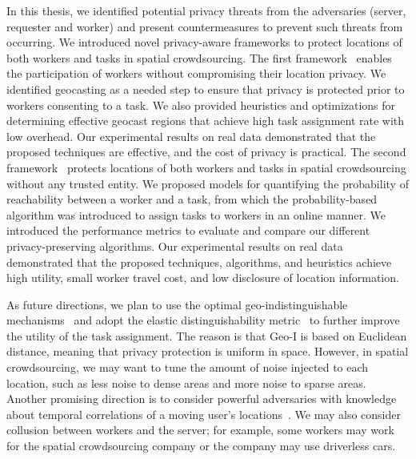 \documentclass{USC-Thesis}
\numberwithin{equation}{chapter}
\begin{document}
In this thesis, we identified potential privacy threats from the adversaries (server, requester and worker) and present countermeasures to prevent such threats from occurring. We introduced novel privacy-aware frameworks to protect locations of both workers and tasks in spatial crowdsourcing. 
The first framework~\cite{to2014framework} enables the participation of workers without compromising their location privacy.
We identified geocasting as a needed step to ensure that privacy is protected prior to workers consenting to a task. We also provided heuristics and optimizations for determining effective geocast regions that achieve high task assignment rate with low overhead. Our experimental results on real data demonstrated that the proposed techniques are effective, and the cost of privacy is practical.
The second framework~\cite{to2018privacy} protects locations of both workers and tasks in spatial crowdsourcing without any trusted entity. We proposed models for quantifying the probability of reachability between a worker and a task, from which the probability-based algorithm was introduced to assign tasks to workers in an online manner. We introduced the performance metrics to evaluate and compare our different privacy-preserving algorithms. Our experimental results on real data demonstrated that the proposed techniques, algorithms, and heuristics achieve high utility, small worker travel cost, and low disclosure of location information.

As future directions, we plan to use the optimal geo-indistinguishable mechanisms~\cite{bordenabe2014optimal} and adopt the elastic distinguishability metric~\cite{chatzikokolakis2015constructing} to further improve the utility of the task assignment. The reason is that Geo-I is based on Euclidean distance, meaning that privacy protection is uniform in space. However, in spatial crowdsourcing, we may want to tune the amount of noise injected to each location, such as less noise to dense areas and more noise to sparse areas. Another promising direction is to consider powerful adversaries with knowledge about temporal correlations of a moving user's locations~\cite{xiao2015protecting}. We may also consider collusion between workers and the server; for example, some workers may work for the spatial crowdsourcing company or the company may use driverless cars.




%
%



\balance

%
\end{document}
